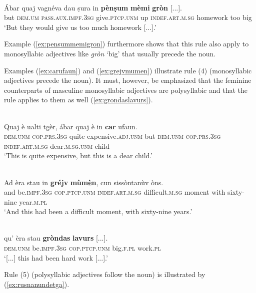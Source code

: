 \ea
\label{ex:pensummemigron}
\\
\gll  Ábar quaj vagnéva dau ṣura in \textbf{pènṣum} \textbf{mèmi} \textbf{gròn} [...].  \\
but \textsc{dem.um} \textsc{pass.aux.impf.3sg} give.\textsc{ptcp.unm} up \textsc{indef.art.m.sg} homework too big\\
\glt `But they would give us too much homework [...].'
\z

Example (\ref{ex:pensummemigron}) furthermore shows that this rule also apply to monosyllabic adjectives like \textit{gròn} `big' that usually precede the noun.

Examples (\ref{ex:carufaun}) and (\ref{ex:grejvmumen}) illustrate rule (4) (monosyllabic adjectives precede the noun). It must, however, be emphasized that the feminine counterparts of masculine monosyllabic adjectives are polysyllabic and that the rule applies to them as well (\ref{ex:grondaslavurs}).

\ea
\label{ex:carufaun}
\\
\gll Quaj è ualti tgèr, ábar quaj è in \textbf{car} ufaun.\\
\textsc{dem.unm} \textsc{cop.prs.3sg} quite expensive.\textsc{adj.unm} but \textsc{dem.unm} \textsc{cop.prs.3sg} \textsc{indef.art.m.sg} dear.\textsc{m.sg.unm} child\\
\glt `This is quite expensive, but this is a dear child.'
\z 

\ea
\label{ex:grejvmumen}
\\
\gll    Ad èra stau in \textbf{gréjv} \textbf{mùmè̱n}, cun sissòntanùv òns.\\
and be.\textsc{impf.3sg} \textsc{cop.ptcp.unm} \textsc{indef.art.m.sg} difficult.\textsc{m.sg} moment with sixty-nine year.\textsc{m.pl} \\
\glt `And this had been a difficult moment, with sixty-nine years.'
\z 

\ea
\label{ex:grondaslavurs}
\\
\gll [...] qu’ èra stau \textbf{gròndas} \textbf{lavurs} [...].\\
{} \textsc{dem.unm} be.\textsc{impf.3sg} \textsc{cop.ptcp.unm} big.\textsc{f.pl} work.\textsc{pl}\\
\glt `[...] this had been hard work [...].'
\z

Rule (5) (polysyllabic adjectives follow the noun) is illustrated by (\ref{ex:rusnanundetga}).

